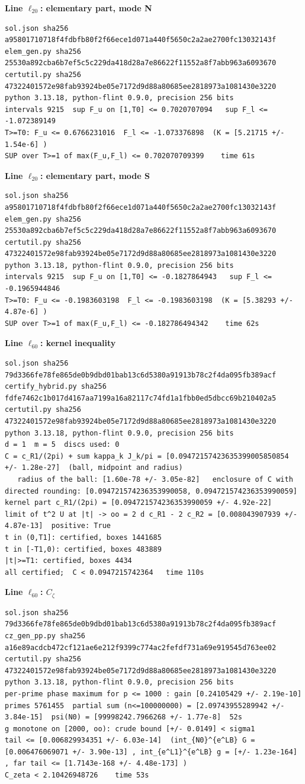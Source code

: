 \documentclass[11pt,reqno]{amsart}
\numberwithin{equation}{section}
\theoremstyle{definition}
\theoremstyle{remark}
\newcommand{\appsub}[1]{\par\medskip\noindent\textbf{#1}\par\nobreak\smallskip}
\begin{document}
\appsub{Line $\ell_{20}$: elementary part, mode N}
\begin{lstlisting}
sol.json sha256 a95801710718f4fdbfb80f2f66ece1d071a440f5650c2a2ae2700fc13032143f
elem_gen.py sha256 25530a892cba6b7ef5c5c229da418d28a7e86622f11552a8f7abb963a6093670
certutil.py sha256 47322401572e98fab93924be05e7172d9d88a80685ee2818973a1081430e3220
python 3.13.18, python-flint 0.9.0, precision 256 bits
intervals 9215  sup F_u on [1,T0] <= 0.7020707094   sup F_l <= -1.072389149
T>=T0: F_u <= 0.6766231016  F_l <= -1.073376898  (K = [5.21715 +/- 1.54e-6] )
SUP over T>=1 of max(F_u,F_l) <= 0.702070709399    time 61s
\end{lstlisting}
\appsub{Line $\ell_{20}$: elementary part, mode S}
\begin{lstlisting}
sol.json sha256 a95801710718f4fdbfb80f2f66ece1d071a440f5650c2a2ae2700fc13032143f
elem_gen.py sha256 25530a892cba6b7ef5c5c229da418d28a7e86622f11552a8f7abb963a6093670
certutil.py sha256 47322401572e98fab93924be05e7172d9d88a80685ee2818973a1081430e3220
python 3.13.18, python-flint 0.9.0, precision 256 bits
intervals 9215  sup F_u on [1,T0] <= -0.1827864943   sup F_l <= -0.1965944846
T>=T0: F_u <= -0.1983603198  F_l <= -0.1983603198  (K = [5.38293 +/- 4.87e-6] )
SUP over T>=1 of max(F_u,F_l) <= -0.182786494342    time 62s
\end{lstlisting}
\appsub{Line $\ell_{60}$: kernel inequality}
\begin{lstlisting}
sol.json sha256 79d3366fe78fe865de0b9dbd01bab13c6d5380a91913b78c2f4da095fb389acf
certify_hybrid.py sha256 fdfe7462c1b017d4167aa7199a16a82117c74fd1a1fbb0ed5dbcc69b210402a5
certutil.py sha256 47322401572e98fab93924be05e7172d9d88a80685ee2818973a1081430e3220
python 3.13.18, python-flint 0.9.0, precision 256 bits
d = 1  m = 5  discs used: 0 
C = c_R1/(2pi) + sum kappa_k J_k/pi = [0.09472157423635399005850854 +/- 1.28e-27]  (ball, midpoint and radius)
   radius of the ball: [1.60e-78 +/- 3.05e-82]   enclosure of C with directed rounding: [0.094721574236353990058, 0.094721574236353990059]
kernel part c_R1/(2pi) = [0.094721574236353990059 +/- 4.92e-22]
limit of t^2 U at |t| -> oo = 2 d c_R1 - 2 c_R2 = [0.008043907939 +/- 4.87e-13]  positive: True
t in (0,T1]: certified, boxes 1441685
t in [-T1,0): certified, boxes 483889
|t|>=T1: certified, boxes 4434
all certified;  C < 0.0947215742364   time 110s
\end{lstlisting}
\appsub{Line $\ell_{60}$: $C_\zeta$}
\begin{lstlisting}
sol.json sha256 79d3366fe78fe865de0b9dbd01bab13c6d5380a91913b78c2f4da095fb389acf
cz_gen_pp.py sha256 a16e89acdcb472cf121ae6e212f9399c774ac2fefdf731a69e919545d763ee02
certutil.py sha256 47322401572e98fab93924be05e7172d9d88a80685ee2818973a1081430e3220
python 3.13.18, python-flint 0.9.0, precision 256 bits
per-prime phase maximum for p <= 1000 : gain [0.24105429 +/- 2.19e-10]
primes 5761455  partial sum (n<=100000000) = [2.09743955289942 +/- 3.84e-15]  psi(N0) = [99998242.7966268 +/- 1.77e-8]  52s
g monotone on [2000, oo): crude bound [+/- 0.0149] < sigma1
tail <= [0.006829934351 +/- 6.03e-14]  (int_{N0}^{e^LB} G = [0.006476069071 +/- 3.90e-13] , int_{e^L1}^{e^LB} g = [+/- 1.23e-164] , far tail <= [1.7143e-168 +/- 4.48e-173] )
C_zeta < 2.10426948726    time 53s
\end{lstlisting}
\end{document}
